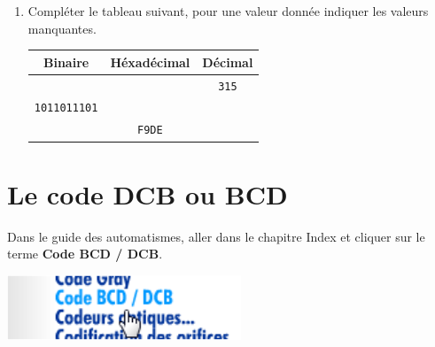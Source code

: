 \documentclass{article}
\begin{document}
\begin{enumerate}
	\item Compléter le tableau suivant, pour une valeur donnée indiquer les valeurs manquantes.
\begin{center}
	\begin{Form}
		\begin{tabular}{|c|c|c|}
			\hline
			Binaire & Héxadécimal & Décimal \\
			\hline
			\hline
			\TextField[name=r15b0,width=8em]{} & \TextField[name=r15h0,width=4em]{} & \texttt{315}\\
			\hline
			\texttt{1011011101} & \TextField[name=r15h1,width=4em]{} & \TextField[name=r15d1,width=4em]{}\\
			\hline
			\TextField[name=r15b2,width=8em]{} & \texttt{F9DE} & \TextField[name=r15d2,width=4em]{}\\
			\hline
		\end{tabular}
	\end{Form}
\end{center}
\end{enumerate}

\section{Le code DCB ou BCD}
Dans le guide des automatismes, aller dans le chapitre \og{}Index\fg{} et cliquer sur le terme \textbf{Code BCD / DCB}.

\begin{center}
	\includegraphics[width=.3\linewidth]{./figures/gda3.png}
\end{center}
\end{document}
